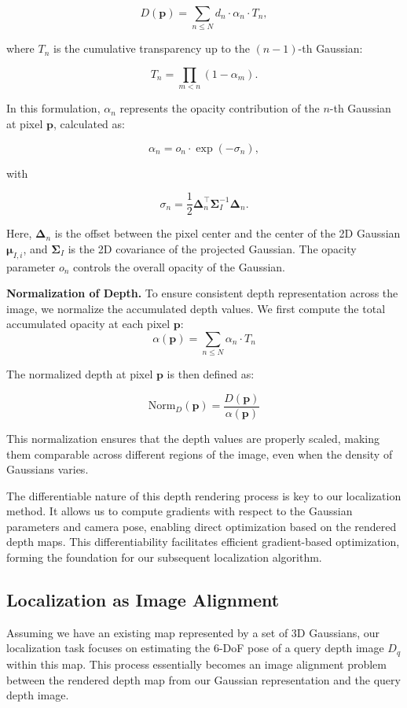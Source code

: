 \documentclass[twocolumn]{article} %
\begin{document}
\[D(\mathbf{p}) = \sum_{n \leq N} d_n \cdot \alpha_n \cdot T_n,\]

where \(T_n\) is the cumulative transparency up to the \((n-1)\)-th
Gaussian:

\[T_n = \prod_{m < n} (1 - \alpha_m).\]

In this formulation, \(\alpha_n\) represents the opacity contribution of
the \(n\)-th Gaussian at pixel \(\mathbf{p}\), calculated as:

\[\alpha_n = o_n \cdot \exp(-\sigma_n),\]

with

\[\sigma_n = \frac{1}{2} \boldsymbol{\Delta}_n^\top \boldsymbol{\Sigma}_I^{-1} \boldsymbol{\Delta}_n.\]

Here, \(\boldsymbol{\Delta}_n\) is the offset between the pixel center
and the center of the 2D Gaussian \(\boldsymbol{\mu}_{I,i}\), and
\(\boldsymbol{\Sigma}_I\) is the 2D covariance of the projected
Gaussian. The opacity parameter \(o_n\) controls the overall opacity of
the Gaussian.

\textbf{Normalization of Depth.} To ensure consistent depth
representation across the image, we normalize the accumulated depth
values. We first compute the total accumulated opacity at each pixel
\(\mathbf{p}\): \[
\alpha(\mathbf{p}) = \sum_{n \leq N} \alpha_n \cdot T_n
\]

The normalized depth at pixel \(\mathbf{p}\) is then defined as:

\[
\text{Norm}_D(\mathbf{p}) = \frac{D(\mathbf{p})}{\alpha(\mathbf{p})}
\]

This normalization ensures that the depth values are properly scaled,
making them comparable across different regions of the image, even when
the density of Gaussians varies.

The differentiable nature of this depth rendering process is key to our
localization method. It allows us to compute gradients with respect to
the Gaussian parameters and camera pose, enabling direct optimization
based on the rendered depth maps. This differentiability facilitates
efficient gradient-based optimization, forming the foundation for our
subsequent localization algorithm.

\subsection{Localization as Image
Alignment}\label{localization-as-image-alignment}

Assuming we have an existing map represented by a set of 3D Gaussians,
our localization task focuses on estimating the 6-DoF pose of a query
depth image \(D_q\) within this map. This process essentially becomes an
image alignment problem between the rendered depth map from our Gaussian
representation and the query depth image.
\end{document}
